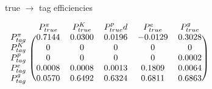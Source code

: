 \documentclass{standalone}
\begin{document}
{\centering true $\rightarrow$ tag efficiencies}

$\displaystyle
\begin{blockarray}{cccccc}
    & P^\pi_{true} & P^K_{true} & P^p_{true} d & P^e_{true} & P^g_{true} \\
\begin{block}{c(ccccc)}
    P^\pi_{tag}  & 0.7144  & 0.0300  & 0.0196  & -0.0129  & 0.3028 \\
    P^K_{tag}    & 0       & 0       & 0       &  0       & 0      \\
    P^p_{tag}    & 0       & 0       & 0       &  0       & 0.0002 \\
    P^e_{tag}    & 0.0008  & 0.0008  & 0.0013  &  0.1809  & 0.0064 \\
    P^g_{tag}    & 0.0570  & 0.6492  & 0.6324  &  0.6811  & 0.6863 \\
\end{block}
\end{blockarray}
$
\end{document}
